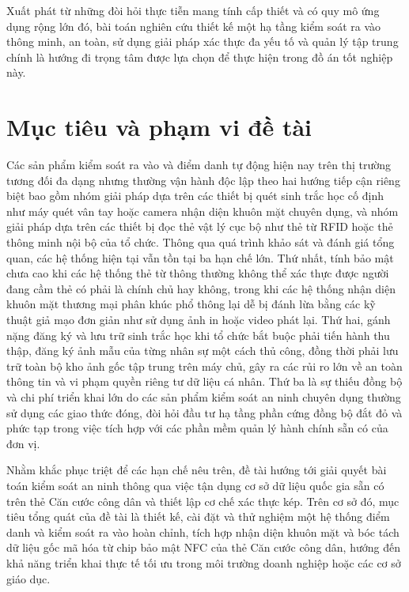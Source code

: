 \documentclass[../DoAn.tex]{subfiles}
\begin{document}
Xuất phát từ những đòi hỏi thực tiễn mang tính cấp thiết và có quy mô ứng dụng rộng lớn đó, bài toán nghiên cứu thiết kế một hạ tầng kiểm soát ra vào thông minh, an toàn, sử dụng giải pháp xác thực đa yếu tố và quản lý tập trung chính là hướng đi trọng tâm được lựa chọn để thực hiện trong đồ án tốt nghiệp này.

\section{Mục tiêu và phạm vi đề tài}
\label{section:1.2}

Các sản phẩm kiểm soát ra vào và điểm danh tự động hiện nay trên thị trường tương đối đa dạng nhưng thường vận hành độc lập theo hai hướng tiếp cận riêng biệt bao gồm nhóm giải pháp dựa trên các thiết bị quét sinh trắc học cố định như máy quét vân tay hoặc camera nhận diện khuôn mặt chuyên dụng, và nhóm giải pháp dựa trên các thiết bị đọc thẻ vật lý cục bộ như thẻ từ RFID hoặc thẻ thông minh nội bộ của tổ chức. Thông qua quá trình khảo sát và đánh giá tổng quan, các hệ thống hiện tại vẫn tồn tại ba hạn chế lớn. Thứ nhất, tính bảo mật chưa cao khi các hệ thống thẻ từ thông thường không thể xác thực được người đang cầm thẻ có phải là chính chủ hay không, trong khi các hệ thống nhận diện khuôn mặt thương mại phân khúc phổ thông lại dễ bị đánh lừa bằng các kỹ thuật giả mạo đơn giản như sử dụng ảnh in hoặc video phát lại. Thứ hai, gánh nặng đăng ký và lưu trữ sinh trắc học khi tổ chức bắt buộc phải tiến hành thu thập, đăng ký ảnh mẫu của từng nhân sự một cách thủ công, đồng thời phải lưu trữ toàn bộ kho ảnh gốc tập trung trên máy chủ, gây ra các rủi ro lớn về an toàn thông tin và vi phạm quyền riêng tư dữ liệu cá nhân. Thứ ba là sự thiếu đồng bộ và chi phí triển khai lớn do các sản phẩm kiểm soát an ninh chuyên dụng thường sử dụng các giao thức đóng, đòi hỏi đầu tư hạ tầng phần cứng đồng bộ đắt đỏ và phức tạp trong việc tích hợp với các phần mềm quản lý hành chính sẵn có của đơn vị.

Nhằm khắc phục triệt để các hạn chế nêu trên, đề tài hướng tới giải quyết bài toán kiểm soát an ninh thông qua việc tận dụng cơ sở dữ liệu quốc gia sẵn có trên thẻ Căn cước công dân và thiết lập cơ chế xác thực kép. Trên cơ sở đó, mục tiêu tổng quát của đề tài là thiết kế, cài đặt và thử nghiệm một hệ thống điểm danh và kiểm soát ra vào hoàn chỉnh, tích hợp nhận diện khuôn mặt và bóc tách dữ liệu gốc mã hóa từ chip bảo mật NFC của thẻ Căn cước công dân, hướng đến khả năng triển khai thực tế tối ưu trong môi trường doanh nghiệp hoặc các cơ sở giáo dục.
\end{document}
